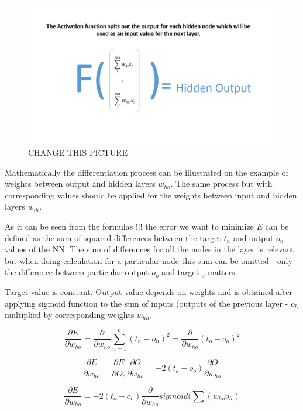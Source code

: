\begin{figure}[H]
    \includegraphics[width=\linewidth]{pics/activation.jpg}
    \caption{\label{fig:bp} CHANGE THIS PICTURE}
\end{figure}

Mathematically the differentiation process can be illustrated on the example of weights between output and hidden layers \(w_{ho}\). The same process but with corresponding values should be applied for the weights between input and hidden layers \(w_{ih}\).

As it can be seen from the formulas !!! the error we want to minimize \(E\) can be defined as the sum of squared differences between the target \(t_n\) and output \(o_n\) values of the NN. The sum of differences for all the nodes in the layer is relevant but when doing calculation for a particular node this sum can be omitted - only the difference between particular output \(o_o\) and target \(_o\) matters.

Target value is constant. Output value depends on weights and is obtained after applying sigmoid function to the sum of inputs (outputs of the previous layer - \(o_h\) multiplied by corresponding weights \(w_{ho}\).

\begin{equation}
\frac{\partial E}{\partial w_{ho}}=\frac{\partial}{\partial w_{ho}}\displaystyle\sum_{n=1}^{n} (t_n-o_n)^2=\frac{\partial}{\partial w_{ho}}(t_o-o_o)^2
\end{equation}

\begin{equation}
\frac{\partial E}{\partial w_{ho}}=\frac{\partial E}{\partial O_{o}}\frac{\partial O}{\partial w_{ho}}=-2(t_o-o_o)\frac{\partial O}{\partial w_{ho}}
\end{equation}

\begin{equation}
\frac{\partial E}{\partial w_{ho}}=-2(t_o-o_o)\frac{\partial}{\partial w_{ho}}sigmoid(\sum(w_{ho}o_h)
\end{equation}

